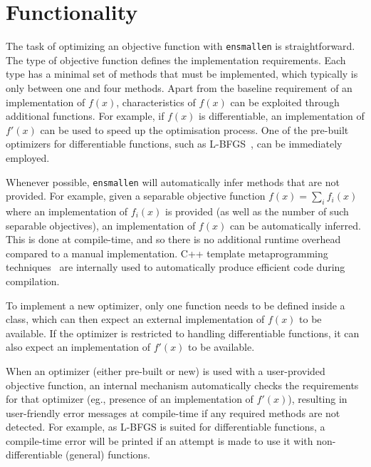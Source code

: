 \documentclass[twoside,11pt]{article}
\begin{document}
\section{Functionality}

The task of optimizing an objective function with {\tt ensmallen} is straightforward.
The type of objective function defines the implementation requirements.
Each type has a minimal set of methods that must be implemented,
which typically is only between one and four methods.
Apart from the baseline requirement of an implementation of $f(x)$,
characteristics of $f(x)$ can be exploited through additional functions.
For example, if $f(x)$ is differentiable,
an implementation of $f'(x)$ can be used to speed up the optimisation process.
One of the pre-built optimizers for differentiable functions,
such as L-BFGS~\citep{liu1989limited},
can be immediately employed.

Whenever possible, {\tt ensmallen} will automatically infer methods
that are not provided.
For example, given a separable objective function
$f(x) = \sum_i f_i(x)$
where an implementation of $f_i(x)$ is provided
(as well as the number of such separable objectives),
an implementation of $f(x)$ can be automatically inferred.
This is done at compile-time, and so there is no additional runtime
overhead compared to a manual implementation.
C++ template metaprogramming techniques~\citep{Abrahams_2004,alexandrescu2001modern}
are internally used to automatically produce efficient code during compilation.

To implement a new optimizer,
only one function needs to be defined inside a class,
which can then expect an external implementation of $f(x)$ to be available.
If the optimizer is restricted to handling differentiable functions,
it can also expect an implementation of $f'(x)$ to be available.

When an optimizer (either pre-built or new) is used with a user-provided objective function,
an internal mechanism automatically checks the requirements for that optimizer
(eg., presence of an implementation of $f'(x)$),
resulting in user-friendly error messages at compile-time
if any required methods are not detected.
For example, as L-BFGS is suited for differentiable functions,
a compile-time error will be printed if an attempt is made
to use it with non-differentiable (general) functions.
\end{document}
